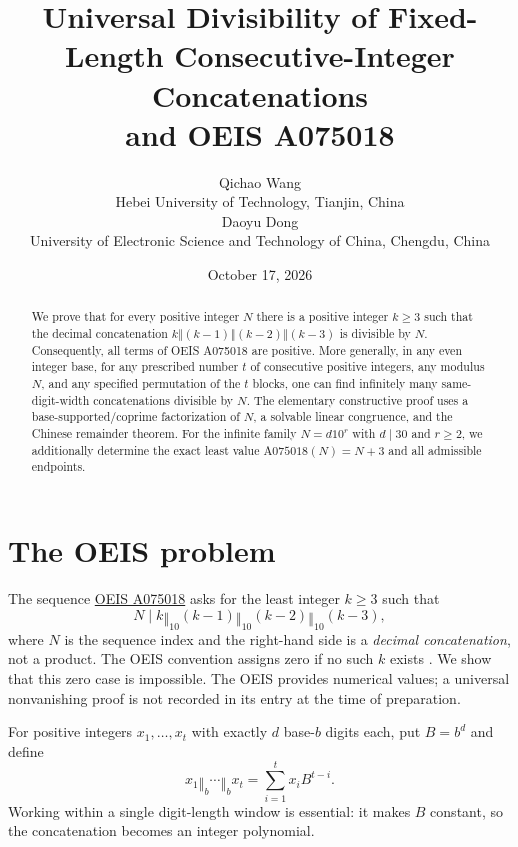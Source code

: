 \documentclass[10pt]{article}
\title{Universal Divisibility of Fixed-Length Consecutive-Integer Concatenations\\and OEIS A075018}
\author{Qichao Wang\\{\small Hebei University of Technology, Tianjin, China}\\[0.4em]Daoyu Dong\\{\small University of Electronic Science and Technology of China, Chengdu, China}}
\date{October 17, 2026}
\newcommand{\cat}{\mathbin{\Vert}}
\begin{document}
\maketitle
\begin{abstract}
We prove that for every positive integer $N$ there is a positive integer
$k\ge3$ such that the decimal concatenation
$k\cat(k-1)\cat(k-2)\cat(k-3)$ is divisible by $N$.
Consequently, all terms of OEIS A075018 are positive.
More generally, in any even integer base, for any prescribed number $t$
of consecutive positive integers, any modulus $N$, and any specified
permutation of the $t$ blocks, one can find infinitely many
same-digit-width concatenations divisible by $N$.
The elementary constructive proof uses a base-supported/coprime
factorization of $N$, a solvable linear congruence, and the Chinese
remainder theorem. For the infinite family $N=d10^r$ with $d\mid30$
and $r\ge2$, we additionally determine the exact least value
$\mathrm{A075018}(N)=N+3$ and all admissible endpoints.
\end{abstract}

\section{The OEIS problem}
The sequence \href{https://oeis.org/A075018}{OEIS A075018}
asks for the least integer $k\ge3$ such that
\begin{equation}\label{eq:target}
 N\mid k\cat_{10}(k-1)\cat_{10}(k-2)\cat_{10}(k-3),
\end{equation}
where $N$ is the sequence index and the right-hand side is a
\emph{decimal concatenation}, not a product. The OEIS convention
assigns zero if no such $k$ exists \cite{oeis}. We show that this
zero case is impossible. The OEIS provides numerical values; a
universal nonvanishing proof is not recorded in its entry at the
time of preparation.

For positive integers $x_1,\ldots,x_t$ with exactly $d$ base-$b$
digits each, put $B=b^d$ and define
\begin{equation}\label{eq:polynomial}
 x_1\cat_b\cdots\cat_b x_t
 =\sum_{i=1}^{t}x_i B^{t-i}.
\end{equation}
Working within a single digit-length window is essential: it makes
$B$ constant, so the concatenation becomes an integer polynomial.
\end{document}
